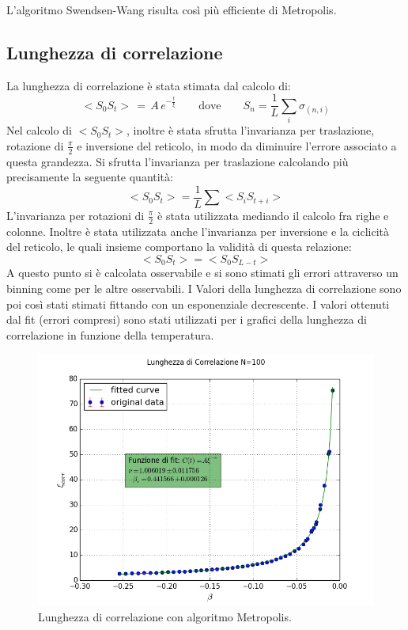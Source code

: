 L'algoritmo Swendsen-Wang risulta così più efficiente di Metropolis.

\newpage
\subsection{Lunghezza di correlazione}

La lunghezza di correlazione è stata stimata dal calcolo di:
$$
	<S_0 S_t > \, = \, A \, e^{-\frac{t}{\xi}} \qquad \mbox{dove} \qquad S_n = \frac{1}{L} \sum_i \sigma_{(n,i)} 
$$
Nel calcolo di $<S_0 S_t>$, inoltre è stata sfrutta l'invarianza per traslazione, rotazione di $\frac{\pi}{2}$ e inversione del reticolo, in modo da diminuire l'errore associato a questa grandezza.
Si sfrutta l'invarianza per traslazione calcolando più precisamente la seguente quantità:
$$
	<S_0 S_t> = \frac{1}{L} \sum <S_i S_{t+i}>
$$ 
L'invarianza per rotazioni di $\frac{\pi}{2}$ è stata utilizzata mediando il calcolo fra righe e colonne. Inoltre è stata utilizzata anche l'invarianza per inversione  e la ciclicità del reticolo, le quali insieme comportano la validità di questa relazione:
$$
	< S_0 S_t> = < S_0 S_{L-t}>
$$
A questo punto si è calcolata osservabile e si sono stimati gli errori attraverso un binning come per le altre osservabili.
I Valori della lunghezza di correlazione sono poi così stati stimati fittando con un esponenziale decrescente. I valori ottenuti dal fit (errori compresi) sono stati utilizzati per i grafici della lunghezza di correlazione in funzione della temperatura.
\begin{figure}[t]
\centering
	\includegraphics[scale=0.56]{metropolis/corrN100.png}
\caption{Lunghezza di correlazione con algoritmo Metropolis.}
\end{figure}
